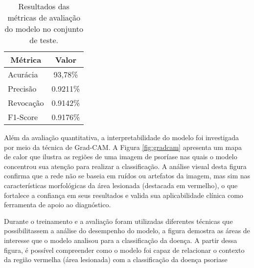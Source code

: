 \begin{table}[h]
  \centering
  \label{tab:resultados_metricas}
  \begin{tabular}{|l|c|}
  \hline
  \multicolumn{1}{|c|}{\textbf{Métrica}} & \textbf{Valor} \\ \hline
  Acurácia                               & 93,78\%           \\ \hline
  Precisão                               & 0.9211\%           \\ \hline
  Revocação                              & 0.9142\%           \\ \hline
  F1-Score                               & 0.9176\%           \\ \hline
  \end{tabular}
  \caption{Resultados das métricas de avaliação do modelo no conjunto de teste.}
\end{table}

Além da avaliação quantitativa, a interpretabilidade do modelo foi investigada por meio da técnica de Grad-CAM. A Figura \ref{fig:gradcam} apresenta um mapa de calor que ilustra as regiões de uma imagem de psoríase nas quais o modelo concentrou sua atenção para realizar a classificação. A análise visual desta figura confirma que a rede não se baseia em ruídos ou artefatos da imagem, mas sim nas características morfológicas da área lesionada (destacada em vermelho), o que fortalece a confiança em seus resultados e valida sua aplicabilidade clínica como ferramenta de apoio ao diagnóstico.


Durante o treinamento e a avaliação foram utilizadas diferentes técnicas que possibilitassem a análise do desempenho do modelo, a figura demostra as áreas de interesse que o modelo analisou para a classificação da doença. A partir dessa figura, é possível compreender como o modelo foi capaz de relacionar o contexto da região vermelha (área lesionada) com a classificação da doença psoriase



